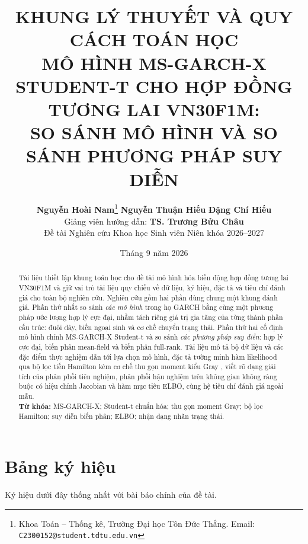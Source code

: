 \documentclass[12pt,a4paper]{article}
\title{\large\bfseries KHUNG LÝ THUYẾT VÀ QUY CÁCH TOÁN HỌC\\[0.35em]
\Large MÔ HÌNH MS-GARCH-X STUDENT-T CHO HỢP ĐỒNG TƯƠNG LAI VN30F1M:\\
SO SÁNH MÔ HÌNH VÀ SO SÁNH PHƯƠNG PHÁP SUY DIỄN}
\author{\textbf{Nguyễn Hoài Nam}\thanks{Khoa Toán -- Thống kê, Trường Đại học Tôn Đức Thắng. Email: \texttt{C2300152@student.tdtu.edu.vn}} \quad
\textbf{Nguyễn Thuận Hiếu}\footnotemark[1] \quad
\textbf{Đặng Chí Hiếu}\footnotemark[1] \\[0.3em]
\normalsize Giảng viên hướng dẫn: \textbf{TS. Trương Bửu Châu}\\[0.2em]
\normalsize Đề tài Nghiên cứu Khoa học Sinh viên Niên khóa 2026--2027}
\date{\normalsize Tháng 9 năm 2026}
\numberwithin{equation}{section}
\theoremstyle{definition}
\begin{document}
\maketitle
\thispagestyle{empty}

\begin{abstract}
\noindent Tài liệu thiết lập khung toán học cho đề tài mô hình hóa biến động hợp đồng
tương lai VN30F1M và giữ vai trò tài liệu quy chiếu về dữ liệu, ký hiệu, đặc tả và tiêu
chí đánh giá cho toàn bộ nghiên cứu. Nghiên cứu gồm hai phần dùng chung một khung đánh
giá. Phần thứ nhất so sánh \emph{các mô hình} trong họ GARCH bằng cùng một phương pháp
ước lượng hợp lý cực đại, nhằm tách riêng giá trị gia tăng của từng thành phần cấu trúc:
đuôi dày, biến ngoại sinh và cơ chế chuyển trạng thái. Phần thứ hai cố định mô hình chính
MS-GARCH-X Student-t và so sánh \emph{các phương pháp suy diễn}: hợp lý cực đại, biến
phân mean-field và biến phân full-rank. Tài liệu mô tả bộ dữ liệu và các đặc điểm thực
nghiệm dẫn tới lựa chọn mô hình, đặc tả tường minh hàm likelihood qua bộ lọc tiến Hamilton
\cite{hamilton1989} kèm cơ chế thu gọn moment kiểu Gray \cite{gray1996}, viết rõ dạng
giải tích của phân phối tiên nghiệm, phân phối hậu nghiệm trên không gian không ràng buộc
có hiệu chỉnh Jacobian và hàm mục tiêu ELBO, cùng hệ tiêu chí đánh giá ngoài mẫu.
\\[0.4em]
\textbf{Từ khóa:} MS-GARCH-X; Student-t chuẩn hóa; thu gọn moment Gray; bộ lọc Hamilton;
suy diễn biến phân; ELBO; nhận dạng nhãn trạng thái.
\end{abstract}

\vspace{0.2cm}

\section*{Bảng ký hiệu}
\noindent Ký hiệu dưới đây thống nhất với bài báo chính của đề tài.
\end{document}
